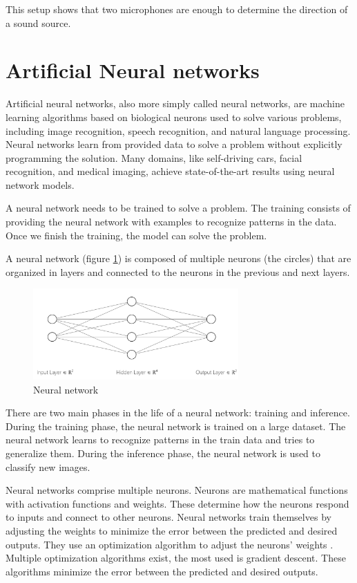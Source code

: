 This setup shows that two microphones are enough to determine the direction of a sound source.

\section{Artificial Neural networks}

Artificial neural networks, also more simply called neural networks, are machine learning algorithms based on biological neurons used to solve various problems, including image recognition, speech recognition, and natural language processing. Neural networks learn from provided data to solve a problem without explicitly programming the solution. Many domains, like self-driving cars, facial recognition, and medical imaging, achieve state-of-the-art results using neural network models. 

A neural network needs to be trained to solve a problem. The training consists of providing the neural network with examples to recognize patterns in the data. Once we finish the training, the model can solve the problem.

A neural network (figure \ref*{fig:neural_network}) is composed of multiple neurons (the circles) that are organized in layers and connected to the neurons in the previous and next layers. 

\begin{figure}[H]
    \centering
    \includegraphics[width=0.7\textwidth]{../Images/neural_network_example.png}
    \caption{Neural network}
    \label{fig:neural_network}
\end{figure}

There are two main phases in the life of a neural network: training and inference. During the training phase, the neural network is trained on a large dataset. The neural network learns to recognize patterns in the train data and tries to generalize them. During the inference phase, the neural network is used to classify new images.

Neural networks comprise multiple neurons. Neurons are mathematical functions with activation functions and weights. These determine how the neurons respond to inputs and connect to other neurons. Neural networks train themselves by adjusting the weights to minimize the error between the predicted and desired outputs. They use an optimization algorithm to adjust the neurons' weights \cite{sun2019optimization}. Multiple optimization algorithms exist, the most used is gradient descent\cite{zhang2019gradient}. These algorithms minimize the error between the predicted and desired outputs.

